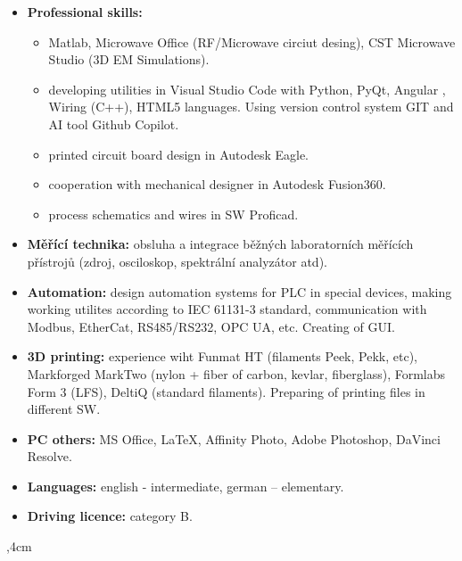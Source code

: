 \documentclass[10pt]{article}
\begin{document}
\begin{itemize}
    \item \textbf{Professional skills:} 
    \begin{itemize}
        \item Matlab, Microwave Office (RF/Microwave circiut desing), CST Microwave Studio (3D EM Simulations).
        \item developing utilities in Visual Studio Code with Python, PyQt, Angular , Wiring (C++), HTML5 languages. Using version control system GIT and AI tool Github Copilot.
        \item printed circuit board design in Autodesk Eagle.
        \item cooperation with mechanical designer in Autodesk Fusion360.
        \item process schematics and wires in SW Proficad.
    \end{itemize}
    \item \textbf{Měřící technika:} obsluha a integrace běžných laboratorních měřících přístrojů (zdroj, osciloskop, spektrální analyzátor atd).
    \item \textbf{Automation:} design automation systems for PLC in special devices, making working utilites according to IEC 61131-3 standard, communication
    with Modbus, EtherCat, RS485/RS232, OPC UA, etc. Creating of GUI.
    \item \textbf{3D printing:} experience wiht Funmat HT (filaments Peek, Pekk, etc), Markforged MarkTwo (nylon + fiber of carbon, kevlar, fiberglass), Formlabs Form 3 (LFS), DeltiQ (standard filaments). 
    Preparing of printing files in different SW.
    \item \textbf{PC others:} MS Office, \LaTeX, Affinity Photo, Adobe Photoshop, DaVinci Resolve.
    \item \textbf{Languages:} english - intermediate, german – elementary.
    \item \textbf{Driving licence:} category B.
\end{itemize}

\noindent\hrulefill
{},4cm
\end{document}
